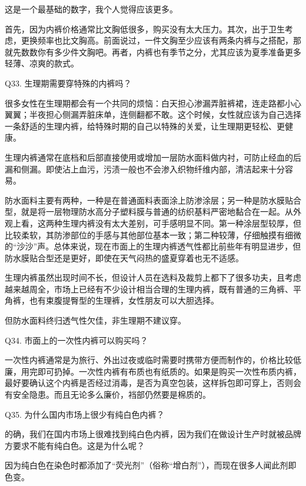 \documentclass[12pt,UTF8]{ctexbook}
\begin{document}
这是一个最基础的数字，我个人觉得应该更多。

首先，因为内裤价格通常比文胸低很多，购买没有太大压力。其次，出于卫生考虑，更换频率也比文胸高。前面说过，一件文胸至少应该有两条内裤与之搭配，那就先数数你有多少件文胸吧。再者，内裤也有季节之分，尤其应该为夏季准备更多轻薄、凉爽的款式。





Q33. 生理期需要穿特殊的内裤吗？


很多女性在生理期都会有一个共同的烦恼：白天担心渗漏弄脏裤裙，连走路都小心翼翼；半夜担心侧漏弄脏床单，连侧翻都不敢。这个时候，女性就应该为自己选择一条舒适的生理内裤，给特殊时期的自己以特殊的关爱，让生理期更轻松、更健康。

生理内裤通常在底档和后部直接使用或增加一层防水面料做内衬，可防止经血的后漏和侧漏。即使沾上血污，污渍一般也不会渗入织物纤维内部，清洁起来十分容易。

防水面料主要有两种，一种是在普通面料表面涂上防渗涂层；另一种是防水膜贴合型，就是将一层物理防水高分子塑料膜与普通的纺织基料严密地黏合在一起。从外观上看，这两种生理内裤没有太大差别，可手感明显不同。第一种涂层型较厚，但比较柔软，其防渗部位的手感与其他部位基本一致；第二种较薄，仔细触摸有细微的“沙沙”声。总体来说，现在市面上的生理内裤透气性都比前些年有明显进步，但防水膜贴合型还是更好，即使在天气闷热的盛夏穿着也无不适感。

生理内裤虽然出现时间不长，但设计人员在选料及裁剪上都下了很多功夫，且考虑越来越周全，市场上已经有不少设计相当合理的生理内裤，既有普通的三角裤、平角裤，也有束腹提臀型的生理裤，女性朋友可以大胆选择。

但防水面料终归透气性欠佳，非生理期不建议穿。





Q34. 市面上的一次性内裤可以购买吗？


一次性内裤通常是为旅行、外出过夜或临时需要时携带方便而制作的，价格比较低廉，用完即可扔掉。一次性内裤有布质也有纸质的。如果是购买一次性布质内裤，最好要确认这个内裤是否经过消毒，是否为真空包装，这样拆包即可穿上，否则会有安全隐患。而且无论多么廉价，裆部仍然要是棉质的。





Q35. 为什么国内市场上很少有纯白色内裤？


的确，我们在国内市场上很难找到纯白色内裤，因为我们在做设计生产时就被品牌方要求不能有纯白色。这是为什么呢？

因为纯白色在染色时都添加了“荧光剂”（俗称“增白剂”），而现在很多人闻此剂即色变。
\end{document}
